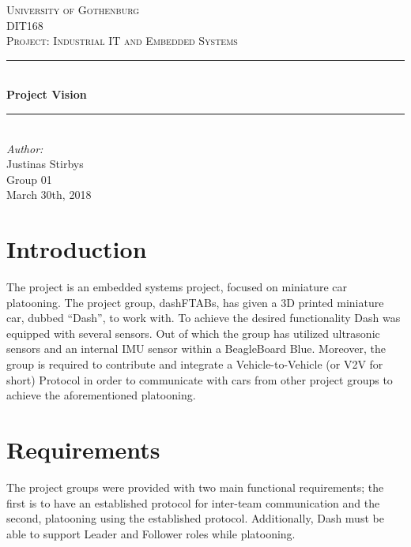 \documentclass[12pt]{article}
\begin{document}
\begin{titlepage}

\newcommand{\Line}{\rule{\linewidth}{0.5mm}} 

\center
 
\textsc{\LARGE University of Gothenburg}
\\[3.5cm] 

\textsc{\Large DIT168}\\[0.3cm]
\textsc{\large Project: Industrial IT and Embedded Systems}\\[0.5cm]

\Line \\[0.4cm]
{\huge \bfseries Project Vision}\\[0.4cm]
\Line \\[0.5cm]
 
\Large \textit{Author:}
\\Justinas Stirbys \\[7cm]

{\large Group 01} \\[0.3cm]
{\large March 30th, 2018}

\vfill

\end{titlepage}



\section{Introduction} 

The project is an embedded systems project, focused on miniature car platooning. The project group, dashFTABs, has given a 3D printed miniature car, dubbed “Dash”, to work with. To achieve the desired functionality Dash was equipped with several sensors. Out of which the group has utilized ultrasonic sensors and an internal IMU sensor within a BeagleBoard Blue. Moreover, the group is required to contribute and integrate a Vehicle-to-Vehicle (or V2V for short) Protocol in order to communicate with cars from other project groups to achieve the aforementioned platooning.

\section{Requirements}
The project groups were provided with two main functional requirements; the first is to have an established protocol for inter-team communication and the second, platooning using the established protocol. Additionally, Dash must be able to support Leader and Follower roles while platooning. \par
\end{document}
